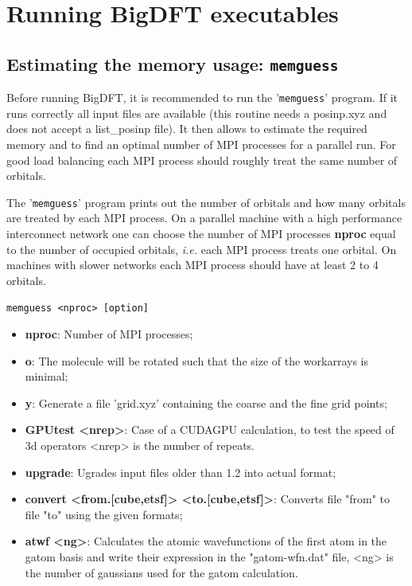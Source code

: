 \documentclass[a4paper,11pt]{report}
\begin{document}
\chapter{ Running BigDFT executables}

\section{Estimating the memory usage: \texttt{memguess}}
Before running BigDFT, it is recommended to run the '\texttt{memguess}' program. If it runs correctly all input files are available 
(this routine needs a posinp.xyz and does not accept a list\_posinp file). It then allows to estimate the required memory and to 
find an optimal number of MPI processes for a parallel run. For good load balancing each MPI process should roughly treat the same number of orbitals.

The '\texttt{memguess}' program prints out the number of orbitals and how many orbitals are treated by each MPI process. 
On a parallel machine with a high performance interconnect network one can choose the number of MPI processes {\bf nproc} equal 
to the number of occupied orbitals, \textit{i.e.} each MPI process treats one orbital. On machines with slower networks each MPI process should 
have at least 2 to 4 orbitals.

\texttt{memguess <nproc> [option]}

\begin{itemize}
\item {\bf nproc}: Number of MPI processes;
\item {\bf o}: The molecule will be rotated such that the size of the workarrays is minimal;
\item {\bf y}: Generate a file 'grid.xyz' containing the coarse and the fine grid points;
\item {\bf GPUtest <nrep>}: Case of a CUDAGPU calculation, to test the speed of 3d operators <nrep> is the number of repeats.
\item {\bf upgrade}: Ugrades input files older than 1.2 into actual format;
\item {\bf convert <from.[cube,etsf]> <to.[cube,etsf]>}: Converts file "from" to file "to" using the given formats;
\item {\bf atwf <ng>}: Calculates the atomic wavefunctions of the first atom in the gatom basis and write their expression in the "gatom-wfn.dat" file, <ng> is the number of gaussians used for the gatom calculation.
\end{itemize}
\end{document}
